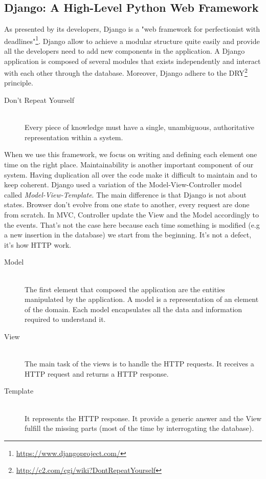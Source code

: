 \subsection{Django: A High-Level Python Web Framework}
As presented by its developers, Django is a "web framework for perfectionist with deadlines"\footnote{\url{https://www.djangoproject.com/}}. Django allow to achieve a modular structure quite easily and provide all the developers need to add new components in the application. A Django application is composed of several modules that exists independently and interact with each other through the database.
Moreover, Django adhere to the DRY\footnote{\url{http://c2.com/cgi/wiki?DontRepeatYourself}} principle.
\begin{description}
  \item[Don't Repeat Yourself] \hfill \\
  Every piece of knowledge must have a single, unambiguous, authoritative representation within a system.
\end{description}
When we use this framework, we focus on writing and defining each element one time on the right place. Maintainability is another important component of our system. Having duplication all over the code make it difficult to maintain and to keep coherent.
Django used a variation of the Model-View-Controller model called \emph{Model-View-Template}\cite{mvt}. The main difference is that Django is not about states. Browser don't evolve from one state to another, every request are done from scratch. In MVC, Controller update the View and the Model accordingly to the events. That's not the case here because each time something is modified (e.g a new insertion in the database) we start from the beginning. It's not a defect, it's how HTTP work.

\begin{description}
\item[Model] \hfill \\
The first element that composed the application are the entities manipulated by the application. A model is a representation of an element of the domain. Each model encapsulates all the data and information required to understand it.
\item[View] \hfill \\
The main task of the views is to handle the HTTP requests. It receives a HTTP request and returns a HTTP response.
\item[Template] \hfill \\
It represents the HTTP response. It provide a generic answer and the View fulfill the missing parts (most of the time by interrogating the database).
\end{description}

